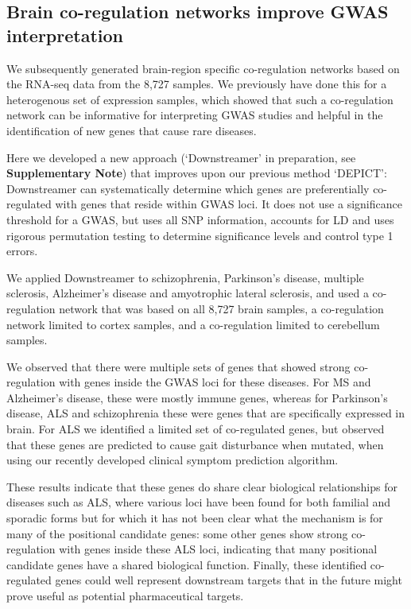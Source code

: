 {\subsection{Brain co-regulation networks improve GWAS interpretation}
We subsequently generated brain-region specific co-regulation networks based on the RNA-seq data from the 8,727 samples. We previously have done this for a heterogenous set of expression samples\cite{persBiologicalInterpretationGenomewide2015,deelenImprovingDiagnosticYield2019}, which showed that such a co-regulation network can be informative for interpreting GWAS studies\cite{persBiologicalInterpretationGenomewide2015} and helpful in the identification of new genes that cause rare diseases\cite{deelenImprovingDiagnosticYield2019}. 

Here we developed a new approach (‘Downstreamer’ in preparation, see \textbf{Supplementary Note}) that improves upon our previous method ‘DEPICT’: Downstreamer can systematically determine which genes are preferentially co-regulated with genes that reside within GWAS loci. It does not use a significance threshold for a GWAS, but uses all SNP information, accounts for LD and uses rigorous permutation testing to determine significance levels and control type 1 errors. 

We applied Downstreamer to schizophrenia, Parkinson’s disease, multiple sclerosis, Alzheimer’s disease and amyotrophic lateral sclerosis, and used a co-regulation network that was based on all 8,727 brain samples, a co-regulation network limited to cortex samples, and a co-regulation limited to cerebellum samples. 

We observed that there were multiple sets of genes that showed strong co-regulation with genes inside the GWAS loci for these diseases. For MS and Alzheimer’s disease, these were mostly immune genes, whereas for Parkinson’s disease, ALS and schizophrenia these were genes that are specifically expressed in brain. For ALS we identified a limited set of co-regulated genes, but observed that these genes are predicted to cause gait disturbance when mutated, when using our recently developed clinical symptom prediction algorithm\cite{deelenImprovingDiagnosticYield2019}. 

These results indicate that these genes do share clear biological relationships for diseases such as ALS, where various loci have been found for both familial and sporadic forms but for which it has not been clear what the mechanism is for many of the positional candidate genes: some other genes show strong co-regulation with genes inside these ALS loci, indicating that many positional candidate genes have a shared biological function. Finally, these identified co-regulated genes could well represent downstream targets that in the future might prove useful as potential pharmaceutical targets. 

}
